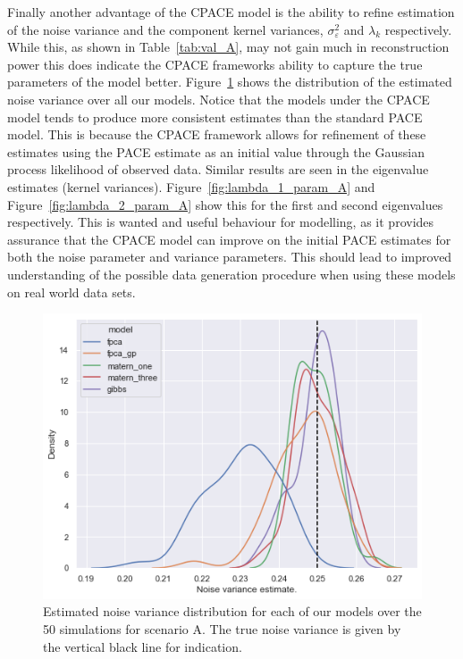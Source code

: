 Finally another advantage of the CPACE model is the ability to refine estimation of the noise variance and the component kernel variances, $\sigma_\varepsilon^2$ and $\lambda_k$  respectively.
While this, as shown in Table~\ref{tab:val_A}, may not gain much in reconstruction power this does indicate the CPACE frameworks ability to capture the true parameters of the model better. 
Figure~\ref{fig:noise_param_A} shows the distribution of the estimated noise variance over all our models. 
Notice that the models under the CPACE model tends to produce more consistent estimates than the standard PACE model.
This is because the CPACE framework allows for refinement of these estimates using the PACE estimate as an initial value through the Gaussian process likelihood of observed data.
Similar results are seen in the eigenvalue estimates (kernel variances).
Figure~\ref{fig:lambda_1_param_A} and Figure~\ref{fig:lambda_2_param_A} show this for the first and second eigenvalues respectively.
This is wanted and useful behaviour for modelling, as it provides assurance that the CPACE model can improve on the initial PACE estimates for both the noise parameter and variance parameters.
This should lead to improved understanding of the possible data generation procedure when using these models on real world data sets.

\begin{figure}
	\centering
	\includegraphics[width=\textwidth]{noise_param_A}
	\caption{Estimated noise variance distribution for each of our models over the 50 simulations for scenario A. The true noise variance is given by the vertical black line for indication.}
		\label{fig:noise_param_A}
\end{figure}

